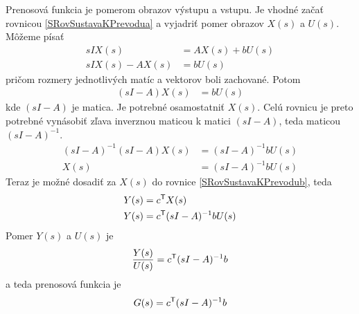 \documentclass[a4paper, 10pt, ]{article}
\begin{document}
Prenosová funkcia je pomerom obrazov výstupu a vstupu. Je vhodné začať rovnicou \eqref{SRovSustavaKPrevodua} a vyjadriť pomer obrazov $X(s)$ a $U(s)$. Môžeme písať
\begin{align}
    s I X(s) &= A X(s) + b U(s) \\
    s I X(s) - A X(s) &= b U(s)
\end{align}
pričom rozmery jednotlivých matíc a vektorov boli zachované. Potom
\begin{align}
    (s I - A) X(s) &= b U(s)
\end{align}
kde $(s I - A)$ je matica. Je potrebné osamostatniť $X(s)$. Celú rovnicu je preto potrebné vynásobiť zľava inverznou maticou k matici $(s I - A)$, teda maticou $(s I - A)^{-1}$.
\begin{align}
    (s I - A)^{-1} (s I - A) X(s) &= (s I - A)^{-1} b U(s) \\
    X(s) &= (s I - A)^{-1} b U(s)
\end{align}
Teraz je možné dosadiť za $X(s)$ do rovnice \eqref{SRovSustavaKPrevodub}, teda
\begin{align}
    Y(s) &= c^{\mathsf{T}} X(s) \\
    Y(s) &= c^{\mathsf{T}} (s I - A)^{-1} b U(s)
\end{align}
Pomer $Y(s)$ a $U(s)$ je
\begin{align}
    \frac{Y(s)}{U(s)} = c^{\mathsf{T}} (s I - A)^{-1} b
\end{align}
a teda prenosová funkcia je
\begin{align}
    G(s) = c^{\mathsf{T}} (s I - A)^{-1} b
\end{align}
\end{document}
